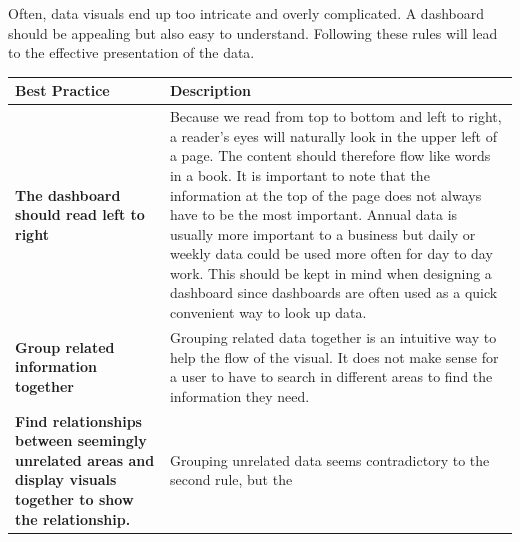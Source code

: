 \documentclass[]{book}
\begin{document}
Often, data visuals end up too intricate and overly complicated. A
dashboard should be appealing but also easy to understand. Following
these rules will lead to the effective presentation of the data.

\begin{longtable}[]{@{}ll@{}}
\toprule
\begin{minipage}[b]{0.17\columnwidth}\raggedright\strut
Best Practice\strut
\end{minipage} & \begin{minipage}[b]{0.72\columnwidth}\raggedright\strut
Description\strut
\end{minipage}\tabularnewline
\midrule
\endhead
\begin{minipage}[t]{0.17\columnwidth}\raggedright\strut
\textbf{The dashboard should read left to right}\strut
\end{minipage} & \begin{minipage}[t]{0.72\columnwidth}\raggedright\strut
Because we read from top to bottom and left to right, a reader's eyes
will naturally look in the upper left of a page. The content should
therefore flow like words in a book. It is important to note that the
information at the top of the page does not always have to be the most
important. Annual data is usually more important to a business but daily
or weekly data could be used more often for day to day work. This should
be kept in mind when designing a dashboard since dashboards are often
used as a quick convenient way to look up data.\strut
\end{minipage}\tabularnewline
\begin{minipage}[t]{0.17\columnwidth}\raggedright\strut
\textbf{Group related information together}\strut
\end{minipage} & \begin{minipage}[t]{0.72\columnwidth}\raggedright\strut
Grouping related data together is an intuitive way to help the flow of
the visual. It does not make sense for a user to have to search in
different areas to find the information they need.\strut
\end{minipage}\tabularnewline
\begin{minipage}[t]{0.17\columnwidth}\raggedright\strut
\textbf{Find relationships between seemingly unrelated areas and display
visuals together to show the relationship.}\strut
\end{minipage} & \begin{minipage}[t]{0.72\columnwidth}\raggedright\strut
Grouping unrelated data seems contradictory to the second rule, but the

\end{minipage}
\end{longtable}
\end{document}
